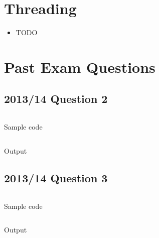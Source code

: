 \documentclass[a4paper]{article}
\begin{document}
\section{Threading}

\begin{itemize}
  \item
    TODO

\end{itemize}

\section{Past Exam Questions}

\subsection{2013/14 Question 2}

\begin{listing}[h!]
  \inputminted[linenos,frame=lines]{cpp}{listings/csc8501_pp1314_q2.cpp}
  \caption{Sample code}
  \label{listing:csc8501_pp1314_q2}
\end{listing}
\FloatBarrier

\begin{listing}[h!]
  \inputminted[linenos,frame=lines]{text}{out/csc8501_pp1314_q2.txt}
  \caption{Output}
  \label{listing:csc8501_pp1314_q2}
\end{listing}
\FloatBarrier

\subsection{2013/14 Question 3}

\begin{listing}[h!]
  \inputminted[linenos,frame=lines]{cpp}{listings/csc8501_pp1314_q3.cpp}
  \caption{Sample code}
  \label{listing:csc8501_pp1314_q3}
\end{listing}
\FloatBarrier

\begin{listing}[h!]
  \inputminted[linenos,frame=lines]{text}{out/csc8501_pp1314_q3.txt}
  \caption{Output}
  \label{listing:csc8501_pp1314_q3}
\end{listing}
\FloatBarrier
\end{document}

